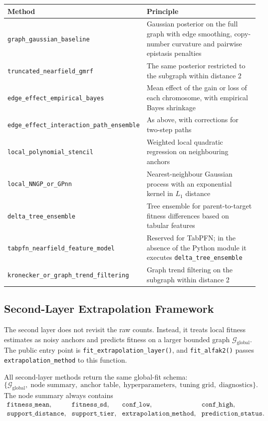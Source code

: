 \documentclass[11pt]{article}
\begin{document}
\begin{center}
\small
\begin{tabular}{L{0.42\textwidth}L{0.5\textwidth}}
\toprule
Method & Principle \\
\midrule
\texttt{graph\_gaussian\_baseline} & Gaussian posterior on the full graph with
edge smoothing, copy-number curvature and pairwise epistasis penalties \\
\texttt{truncated\_nearfield\_gmrf} & The same posterior restricted to the
subgraph within distance 2 \\
\texttt{edge\_effect\_empirical\_bayes} & Mean effect of the gain or loss of
each chromosome, with empirical Bayes shrinkage \\
\texttt{edge\_effect\_interaction\_path\_ensemble} & As above, with
corrections for two-step paths \\
\texttt{local\_polynomial\_stencil} & Weighted local quadratic regression on
neighbouring anchors \\
\texttt{local\_NNGP\_or\_GPnn} & Nearest-neighbour Gaussian process with an
exponential kernel in $L_1$ distance \\
\texttt{delta\_tree\_ensemble} & Tree ensemble for parent-to-target fitness
differences based on tabular features \\
\texttt{tabpfn\_nearfield\_feature\_model} & Reserved for TabPFN; in the
absence of the Python module it executes \texttt{delta\_tree\_ensemble} \\
\texttt{kronecker\_or\_graph\_trend\_filtering} & Graph trend filtering on
the subgraph within distance 2 \\
\bottomrule
\end{tabular}
\end{center}

\subsection{Second-Layer Extrapolation Framework}

The second layer does not revisit the raw counts. Instead, it treats local
fitness estimates as noisy anchors and predicts fitness on a larger bounded
graph $\mathcal{G}_{\mathrm{global}}$. The public entry point is
\texttt{fit\_extrapolation\_layer()}, and \texttt{fit\_alfak2()} passes
\texttt{extrapolation\_method} to this function.

All second-layer methods return the same global-fit schema:
\[
  \{\mathcal{G}_{\mathrm{global}},\;
    \text{node summary},\;
    \text{anchor table},\;
    \text{hyperparameters},\;
    \text{tuning grid},\;
    \text{diagnostics}\}.
\]
The node summary always contains
\[
\begin{array}{llll}
\texttt{fitness\_mean}, & \texttt{fitness\_sd}, &
\texttt{conf\_low}, & \texttt{conf\_high},\\
\texttt{support\_distance}, & \texttt{support\_tier}, &
\texttt{extrapolation\_method}, & \texttt{prediction\_status}.
\end{array}
\]
\end{document}
